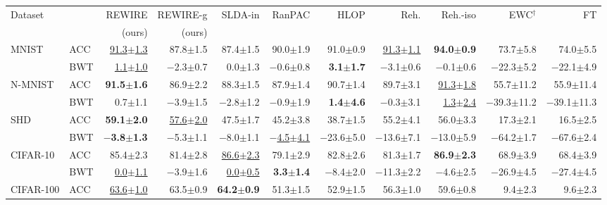 \begin{tabular*}{\textwidth}{@{\extracolsep{\fill}}llrrrrrrrrr@{}}
\toprule
Dataset & & REWIRE & REWIRE-g & SLDA-in & RanPAC & HLOP & Reh. & Reh.-iso & EWC$^{\dagger}$ & FT \\
 & & (ours) & (ours) &  &  &  &  &  &  &  \\
\midrule
MNIST & ACC & \underline{91.3$\pm$1.3} & 87.8$\pm$1.5 & 87.4$\pm$1.5 & 90.0$\pm$1.9 & 91.0$\pm$0.9 & \underline{91.3$\pm$1.1} & \textbf{94.0$\pm$0.9} & 73.7$\pm$5.8 & 74.0$\pm$5.5 \\
 & BWT & \underline{1.1$\pm$1.0} & \ensuremath{-}2.3$\pm$0.7 & 0.0$\pm$1.3 & \ensuremath{-}0.6$\pm$0.8 & \textbf{3.1$\pm$1.7} & \ensuremath{-}3.1$\pm$0.6 & \ensuremath{-}0.1$\pm$0.6 & \ensuremath{-}22.3$\pm$5.2 & \ensuremath{-}22.1$\pm$4.9 \\
N-MNIST & ACC & \textbf{91.5$\pm$1.6} & 86.9$\pm$2.2 & 88.3$\pm$1.5 & 87.9$\pm$1.4 & 90.7$\pm$1.4 & 89.7$\pm$3.1 & \underline{91.3$\pm$1.8} & 55.7$\pm$11.2 & 55.9$\pm$11.4 \\
 & BWT & 0.7$\pm$1.1 & \ensuremath{-}3.9$\pm$1.5 & \ensuremath{-}2.8$\pm$1.2 & \ensuremath{-}0.9$\pm$1.9 & \textbf{1.4$\pm$4.6} & \ensuremath{-}0.3$\pm$3.1 & \underline{1.3$\pm$2.4} & \ensuremath{-}39.3$\pm$11.2 & \ensuremath{-}39.1$\pm$11.3 \\
SHD & ACC & \textbf{59.1$\pm$2.0} & \underline{57.6$\pm$2.0} & 47.5$\pm$1.7 & 45.2$\pm$3.8 & 38.7$\pm$1.5 & 55.2$\pm$4.1 & 56.0$\pm$3.3 & 17.3$\pm$2.1 & 16.5$\pm$2.5 \\
 & BWT & \textbf{\ensuremath{-}3.8$\pm$1.3} & \ensuremath{-}5.3$\pm$1.1 & \ensuremath{-}8.0$\pm$1.1 & \underline{\ensuremath{-}4.5$\pm$4.1} & \ensuremath{-}23.6$\pm$5.0 & \ensuremath{-}13.6$\pm$7.1 & \ensuremath{-}13.0$\pm$5.9 & \ensuremath{-}64.2$\pm$1.7 & \ensuremath{-}67.6$\pm$2.4 \\
\midrule
CIFAR-10 & ACC & 85.4$\pm$2.3 & 81.4$\pm$2.8 & \underline{86.6$\pm$2.3} & 79.1$\pm$2.9 & 82.8$\pm$2.6 & 81.3$\pm$1.7 & \textbf{86.9$\pm$2.3} & 68.9$\pm$3.9 & 68.4$\pm$3.9 \\
 & BWT & \underline{0.0$\pm$1.1} & \ensuremath{-}3.9$\pm$1.6 & \underline{0.0$\pm$0.5} & \textbf{3.3$\pm$1.4} & \ensuremath{-}8.4$\pm$2.0 & \ensuremath{-}11.3$\pm$2.2 & \ensuremath{-}4.6$\pm$2.5 & \ensuremath{-}26.9$\pm$4.5 & \ensuremath{-}27.4$\pm$4.5 \\
CIFAR-100 & ACC & \underline{63.6$\pm$1.0} & 63.5$\pm$0.9 & \textbf{64.2$\pm$0.9} & 51.3$\pm$1.5 & 52.9$\pm$1.5 & 56.3$\pm$1.0 & 59.6$\pm$0.8 & 9.4$\pm$2.3 & 9.6$\pm$2.3 \\

\end{tabular*}
